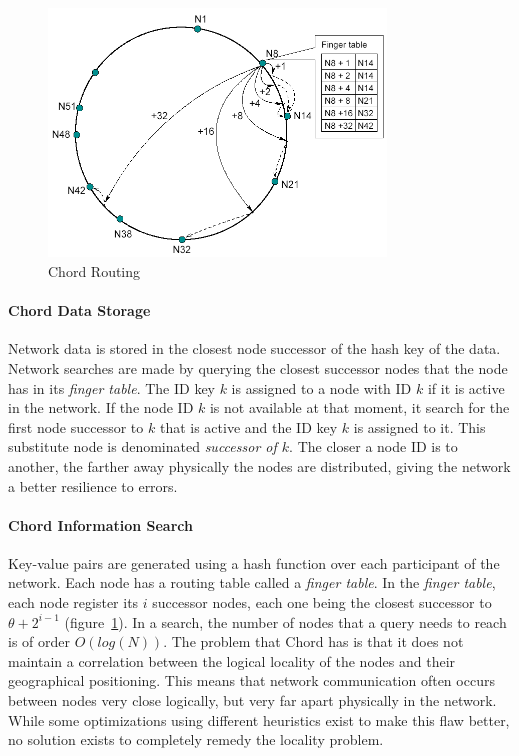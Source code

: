 \label{sec:chord}
\begin{figure}
\center
\includegraphics[width=0.8\textwidth]{img/chord-search}
\caption{Chord Routing}
\label{fig:p2p_estructured_chord_search}
\end{figure}

\paragraph{Chord Data Storage}
Network data is stored in the closest node successor of the hash key of the
data. Network searches are made by querying the closest successor
nodes that the node has in its \textit{finger table}.
The ID key $k$ is assigned to a node with ID $k$ if it is active in the
network. If the node ID $k$ is not available at that moment, it search for the first node
successor to $k$ that is active and the ID key $k$ is assigned to it. This
substitute node is denominated \textit{successor of $k$}.
The closer a node ID is to another, the farther away physically the nodes are
distributed, giving the network a better resilience to errors.

\paragraph{Chord Information Search}
Key-value pairs are generated using a hash function over each participant of
the network.  Each node has a routing table called a \textit{finger table}.
In the \textit{finger table}, each node register its $i$ successor nodes, each
one being the closest successor to $\theta +
2^{i-1}$ (figure~\ref{fig:p2p_estructured_chord_search}). 
In a search, the number of nodes that a query needs to reach is of order
$O(log(N))$.
The problem that Chord has is that it does not maintain a correlation
between the logical locality of the nodes and their geographical positioning. This
means that network communication often occurs between nodes very close
logically, but very far apart physically in the network. While some
optimizations using different heuristics exist to make this flaw better, no solution
exists to completely remedy the locality problem.



